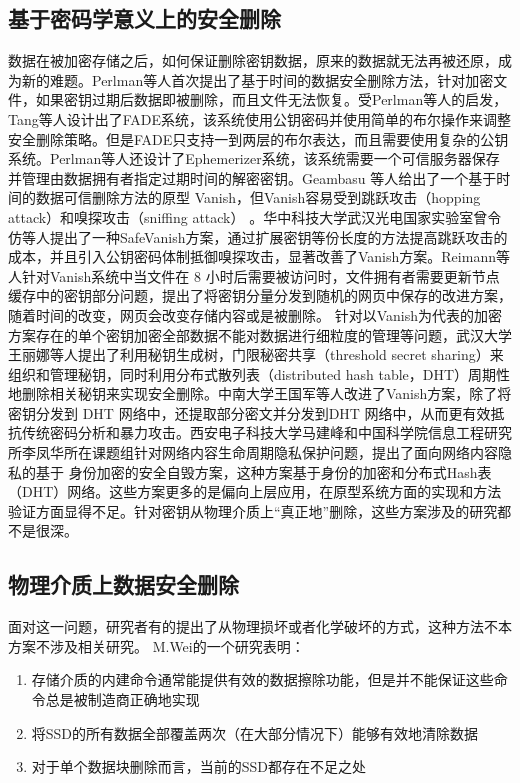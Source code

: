 \subsection{基于密码学意义上的安全删除}
数据在被加密存储之后，如何保证删除密钥数据，原来的数据就无法再被还原，成为新的难题。Perlman等人首次提出了基于时间的数据安全删除方法，针对加密文件，如果密钥过期后数据即被删除，而且文件无法恢复\cite{Perlman2005File}。受Perlman等人的启发，Tang等人设计出了FADE系统\cite{Tang2012Secure}，该系统使用公钥密码并使用简单的布尔操作来调整安全删除策略。但是FADE只支持一到两层的布尔表达，而且需要使用复杂的公钥系统。Perlman等人还设计了Ephemerizer系统\cite{Perlman2005The,Tang2009Timed}，该系统需要一个可信服务器保存并管理由数据拥有者指定过期时间的解密密钥。Geambasu 等人给出了一个基于时间的数据可信删除方法的原型 Vanish\cite{Geambasu2009Vanish}，但Vanish容易受到跳跃攻击（hopping attack）和嗅探攻击（sniffing attack）\cite{Wolchok2010Defeating} 。华中科技大学武汉光电国家实验室曾令仿等人提出了一种SafeVanish\cite{Zeng2010SafeVanish}方案，通过扩展密钥等份长度的方法提高跳跃攻击的成本，并且引入公钥密码体制抵御嗅探攻击，显著改善了Vanish方案。Reimann等人\cite{Reimann2012Timed}针对Vanish系统中当文件在 8 小时后需要被访问时，文件拥有者需要更新节点缓存中的密钥部分问题，提出了将密钥分量分发到随机的网页中保存的改进方案，随着时间的改变，网页会改变存储内容或是被删除。
针对以Vanish为代表的加密方案存在的单个密钥加密全部数据不能对数据进行细粒度的管理等问题，武汉大学王丽娜等人\cite{王丽娜2012一种适于云存储的数据确定性删除方法}提出了利用秘钥生成树，门限秘密共享（threshold secret sharing）来组织和管理秘钥，同时利用分布式散列表（distributed hash table，DHT）周期性地删除相关秘钥来实现安全删除。中南大学王国军等人改进了Vanish方案，除了将密钥分发到 DHT 网络中，还提取部分密文并分发到DHT 网络中，从而更有效抵抗传统密码分析和暴力攻击\cite{Wang2010A}。西安电子科技大学马建峰和中国科学院信息工程研究所李凤华所在课题组针对网络内容生命周期隐私保护问题，提出了面向网络内容隐私的基于
身份加密的安全自毁方案\cite{熊金波2014云计算环境中的组合文档模型及其访问控制方案,熊金波2014基于属性加密的组合文档安全自毁方案,熊金波2014面向网络内容隐私的基于身份加密的安全自毁方案}，这种方案基于身份的加密和分布式Hash表（DHT）网络。这些方案更多的是偏向上层应用，在原型系统方面的实现和方法验证方面显得不足。针对密钥从物理介质上“真正地”删除，这些方案涉及的研究都不是很深。
\subsection{物理介质上数据安全删除}
面对这一问题，研究者有的提出了从物理损坏或者化学破坏的方式，这种方法不本方案不涉及相关研究。
M.Wei的一个研究\cite{Wei2011Reliably}表明：
\begin{enumerate}
\item 存储介质的内建命令通常能提供有效的数据擦除功能，但是并不能保证这些命令总是被制造商正确地实现
\item 将SSD的所有数据全部覆盖两次（在大部分情况下）能够有效地清除数据
\item 对于单个数据块删除而言，当前的SSD都存在不足之处
\end{enumerate}


